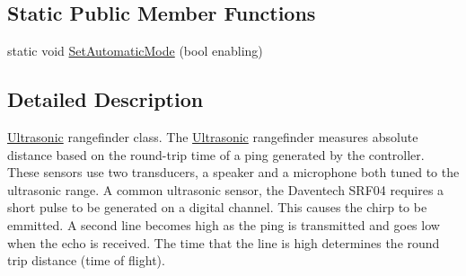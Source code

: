 \subsection*{Static Public Member Functions}
\begin{DoxyCompactItemize}
\item 
static void \hyperlink{classUltrasonic_a16105fb0a316d780b8ea1554e3109825}{SetAutomaticMode} (bool enabling)
\end{DoxyCompactItemize}


\subsection{Detailed Description}
\hyperlink{classUltrasonic}{Ultrasonic} rangefinder class. The \hyperlink{classUltrasonic}{Ultrasonic} rangefinder measures absolute distance based on the round-\/trip time of a ping generated by the controller. These sensors use two transducers, a speaker and a microphone both tuned to the ultrasonic range. A common ultrasonic sensor, the Daventech SRF04 requires a short pulse to be generated on a digital channel. This causes the chirp to be emmitted. A second line becomes high as the ping is transmitted and goes low when the echo is received. The time that the line is high determines the round trip distance (time of flight). 

